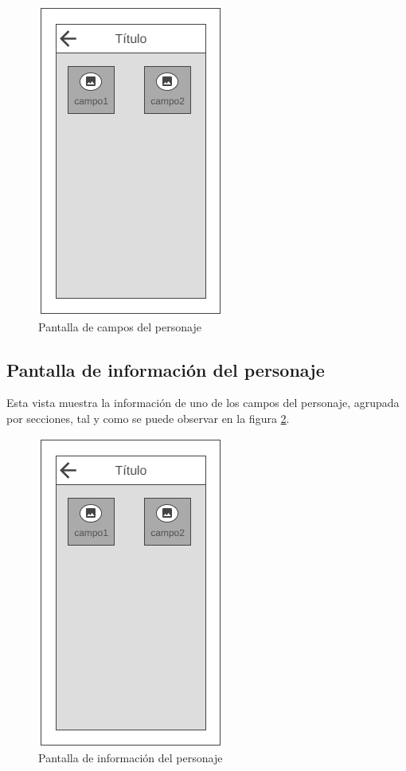 \begin{figure}[H]
    \centering
    \includegraphics[scale=0.6]{Figures/Mockups/Mock_CamposPersonaje.png}
    \caption{Pantalla de campos del personaje}
    \label{CamposPersonaje}    
\end{figure}
\newpage
\subsection{Pantalla de información del personaje}
Esta vista muestra la información de uno de los campos del personaje, agrupada por secciones, tal y como 
se puede observar en la figura \ref*{InfoPersonaje}.


\begin{figure}[H]
    \centering
    \includegraphics[scale=0.6]{Figures/Mockups/Mock_CamposPersonaje.png}
    \caption{Pantalla de información del personaje}
    \label{InfoPersonaje}    
\end{figure}

